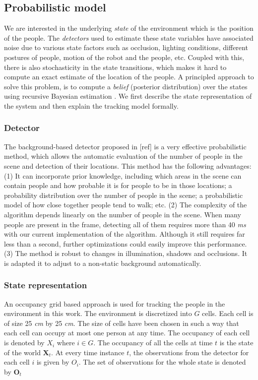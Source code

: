 \subsection{Probabilistic model}

We are interested in the underlying \textit{state} of the environment which is the position of the people. The \textit{detectors} used to estimate these state variables have associated noise due to various state factors such as occlusion, lighting conditions, different postures of people, motion of the robot and the people, etc. Coupled with this, there is also stochasticity in the state transitions, which makes it hard to compute an exact estimate of the location of the people. A principled approach to solve this problem, is to compute a \textit{belief} (posterior distribution) over the states using recursive Bayesian estimation%
. We first describe the state representation of the system and then explain the tracking model formally.

\subsubsection{Detector}
The background-based detector proposed in [ref] is a very effective probabilistic method, which allows the automatic evaluation of the number of people in the scene and detection of their locations. This method has the following advantages: (1) It can incorporate prior knowledge, including which areas in the scene can contain people and how probable it is for people to be in those locations; a probability distribution over the number of people in the scene; a probabilistic model of how close
together people tend to walk; etc. (2) The complexity of the algorithm depends linearly on the number of people in the scene. When many people are present in the frame, detecting all of them requires
more than 40 \textit{ms} with our current implementation of the algorithm. Although it still requires far less than a second, further optimizations could easily improve this performance. (3) The method is robust to changes in illumination, shadows and occlusions. It is adapted it to adjust to a non-static background automatically.

\subsubsection{State representation}

An occupancy grid based approach is used for tracking the people in the environment in this work. The environment is discretized into $G$ cells. Each cell is of size 25 \textit{cm} by 25 \textit{cm}. The size of cells have been chosen in such a way that each cell can occupy at most one person at any time. The occupancy of each cell is denoted by $X_{i}$ where $i \in G$. The occupancy of all the cells at time $t$ is the state of the world $\textbf{X}_{t}$. At every time instance $t$, the observations from the detector for each cell $i$ is given by $O_{i}$. The set of observations for the whole state is denoted by $\textbf{O}_{t}$ 

